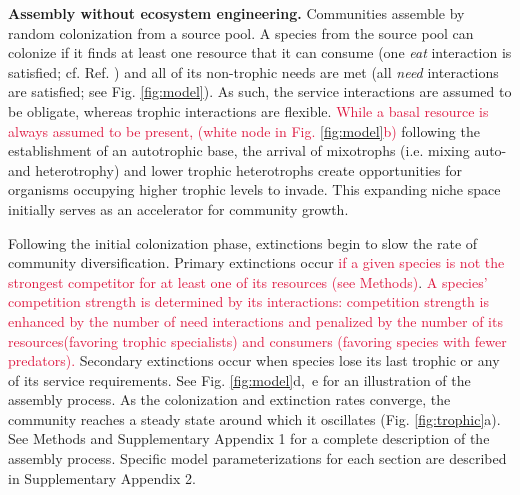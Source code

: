 \documentclass[twocolumn,preprintnumbers,amsmath,amssymb,superscriptaddress,linenumbers]{revtex4-1}
\newcommand{\rev}[1]{\textcolor{crimson}{#1}}
\begin{document}
\vspace{0mm}
\noindent \textbf{Assembly without ecosystem engineering.}
\noindent Communities assemble by random colonization from a source pool.
A species from the source pool can colonize if it finds at least one resource that it can consume (one \emph{eat} interaction is satisfied; cf. Ref. ) and all of its non-trophic needs are met (all \emph{need} interactions are satisfied; see Fig. \ref{fig:model}).
As such, the service interactions are assumed to be obligate, whereas trophic interactions are flexible.
\rev{While a basal resource is always assumed to be present, (white node in Fig. \ref{fig:model}b)} following the establishment of an autotrophic base, the arrival of mixotrophs (i.e. mixing auto- and heterotrophy) and lower trophic heterotrophs create opportunities for organisms occupying higher trophic levels to invade.
This expanding niche space initially serves as an accelerator for community growth.

Following the initial colonization phase, extinctions begin to slow the rate of community diversification.
Primary extinctions occur \rev{if a given species is not the strongest competitor for at least one of its resources (see Methods)}.
\rev{A species' competition strength is determined by its interactions: competition strength is enhanced by the number of need interactions and penalized by the number of its resources(favoring trophic specialists) and consumers (favoring species with fewer predators).}
Secondary extinctions occur when species lose its last trophic or any of its service requirements.
See Fig. \ref{fig:model}d,~e for an illustration of the assembly process. 
As the colonization and extinction rates converge, the community reaches a steady state around which it oscillates (Fig. \ref{fig:trophic}a).
See Methods and Supplementary Appendix 1 for a complete description of the assembly process.
Specific model parameterizations for each section are described in Supplementary Appendix 2. %
\end{document}
